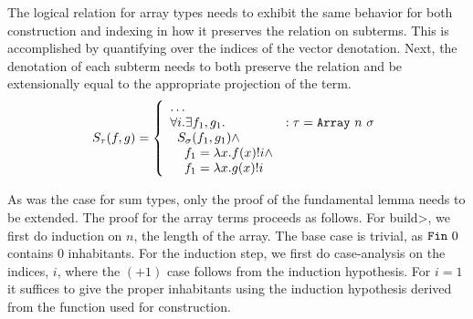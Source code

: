   The logical relation for array types needs to exhibit the same behavior for both construction and indexing in how it preserves the relation on subterms.
  This is accomplished by quantifying over the indices of the vector denotation.
  Next, the denotation of each subterm needs to both preserve the relation and be extensionally equal to the appropriate projection of the term.
  \begin{equation}
    S_\tau(f, g) =
      \left\{
        \begin{array}{ll}
          \dots \\
          \forall i. \exists f_1, g_1.
            & : \tau = \texttt{Array}\ n\ \sigma \\
          \;\;S_\sigma(f_1, g_1) \wedge \\
          \;\;\;\;f_1 = \lambda x. f(x)!i \wedge \\
          \;\;\;\;f_1 = \lambda x. g(x)!i \\
        \end{array}
      \right.
  \label{eqn:lr_array}
  \end{equation}

  As was the case for sum types, only the proof of the fundamental lemma needs to be extended.
  The proof for the array terms proceeds as follows.
  For \<build>, we first do induction on $n$, the length of the array.
  The base case is trivial, as $\texttt{Fin}\ 0$ contains $0$ inhabitants.
  For the induction step, we first do case-analysis on the indices, $i$, where the $(+1)$ case follows from the induction hypothesis.
  For $i=1$ it suffices to give the proper inhabitants using the induction hypothesis derived from the function used for construction.
